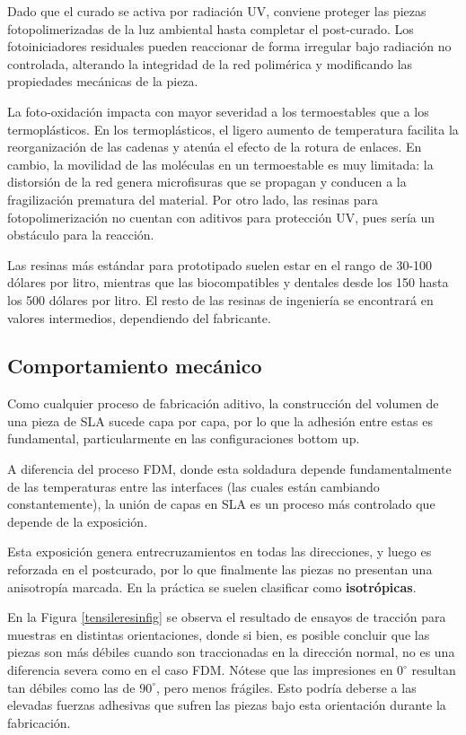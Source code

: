 Dado que el curado se activa por radiación UV, conviene proteger las piezas fotopolimerizadas de la luz ambiental hasta completar el post-curado. Los fotoiniciadores residuales pueden reaccionar de forma irregular bajo radiación no controlada, alterando la integridad de la red polimérica y modificando las propiedades mecánicas de la pieza.

La foto-oxidación impacta con mayor severidad a los termoestables que a los termoplásticos. En los termoplásticos, el ligero aumento de temperatura facilita la reorganización de las cadenas y atenúa el efecto de la rotura de enlaces. En cambio, la movilidad de las moléculas en un termoestable es muy limitada: la distorsión de la red genera microfisuras que se propagan y conducen a la fragilización prematura del material. Por otro lado, las resinas para fotopolimerización no cuentan con aditivos para protección UV, pues sería un obstáculo para la reacción. 

Las resinas más estándar para prototipado suelen estar en el rango de 30-100 dólares por litro, mientras que las biocompatibles y dentales desde los 150 hasta los 500 dólares por litro. El resto de las resinas de ingeniería se encontrará en valores intermedios, dependiendo del fabricante.

\subsection{Comportamiento mecánico}

Como cualquier proceso de fabricación aditivo, la construcción del volumen de una pieza de SLA sucede capa por capa, por lo que la adhesión entre estas es fundamental, particularmente en las configuraciones bottom up.

A diferencia del proceso FDM, donde esta soldadura depende fundamentalmente de las temperaturas entre las interfaces (las cuales están cambiando constantemente), la unión de capas en SLA es un proceso más controlado que depende de la exposición.

Esta exposición genera entrecruzamientos en todas las direcciones, y luego es reforzada en el postcurado, por lo que finalmente las piezas no presentan una anisotropía marcada. En la práctica se suelen clasificar como \textbf{isotrópicas}. 

En la Figura \ref{tensileresinfig} se observa el resultado de ensayos de tracción para muestras en distintas orientaciones, donde si bien, es posible concluir que las piezas son más débiles cuando son traccionadas en la dirección normal, no es una diferencia severa como en el caso FDM. Nótese que las impresiones en $0^{\circ}$ resultan tan débiles como las de $90^{\circ}$, pero menos frágiles. Esto podría deberse a las elevadas fuerzas adhesivas que sufren las piezas bajo esta orientación durante la fabricación.

